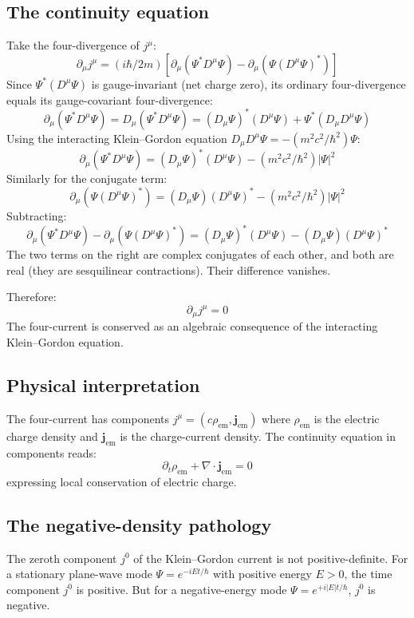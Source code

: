 \documentclass[11pt,a4paper]{article}
\begin{document}
\subsection{The continuity equation}

Take the four-divergence of $j^\mu$:
\[
\partial_\mu j^\mu = (i\hbar/2m)[\partial_\mu(\Psi^* D^\mu\Psi) - \partial_\mu(\Psi(D^\mu\Psi)^*)]
\]
Since $\Psi^*(D^\mu\Psi)$ is gauge-invariant (net charge zero), its ordinary four-divergence equals its gauge-covariant four-divergence:
\[
\partial_\mu(\Psi^* D^\mu\Psi) = D_\mu(\Psi^* D^\mu\Psi) = (D_\mu\Psi)^*(D^\mu\Psi) + \Psi^*(D_\mu D^\mu\Psi)
\]
Using the interacting Klein--Gordon equation $D_\mu D^\mu\Psi = -(m^2c^2/\hbar^2)\Psi$:
\[
\partial_\mu(\Psi^* D^\mu\Psi) = (D_\mu\Psi)^*(D^\mu\Psi) - (m^{2}c^{2}/\hbar^{2})|\Psi|^{2}
\]
Similarly for the conjugate term:
\[
\partial_\mu(\Psi(D^\mu\Psi)^*) = (D_\mu\Psi)(D^\mu\Psi)^* - (m^{2}c^{2}/\hbar^{2})|\Psi|^{2}
\]
Subtracting:
\[
\partial_\mu(\Psi^* D^\mu\Psi) - \partial_\mu(\Psi(D^\mu\Psi)^*) = (D_\mu\Psi)^*(D^\mu\Psi) - (D_\mu\Psi)(D^\mu\Psi)^*
\]
The two terms on the right are complex conjugates of each other, and both are real (they are sesquilinear contractions). Their difference vanishes.

Therefore:
\[
\partial_\mu j^\mu = 0
\]
The four-current is conserved as an algebraic consequence of the interacting Klein--Gordon equation.

\subsection{Physical interpretation}

The four-current has components $j^\mu = (c\rho_{\mathrm{em}}, \mathbf{j}_{\mathrm{em}})$ where $\rho_{\mathrm{em}}$ is the electric charge density and $\mathbf{j}_{\mathrm{em}}$ is the charge-current density. The continuity equation in components reads:
\[
\partial_t\rho_{\mathrm{em}} + \nabla\cdot\mathbf{j}_{\mathrm{em}} = 0
\]
expressing local conservation of electric charge.

\subsection{The negative-density pathology}

The zeroth component $j^0$ of the Klein--Gordon current is not positive-definite. For a stationary plane-wave mode $\Psi = e^{-iEt/\hbar}$ with positive energy $E > 0$, the time component $j^0$ is positive. But for a negative-energy mode $\Psi = e^{+i|E|t/\hbar}$, $j^0$ is negative.
\end{document}
